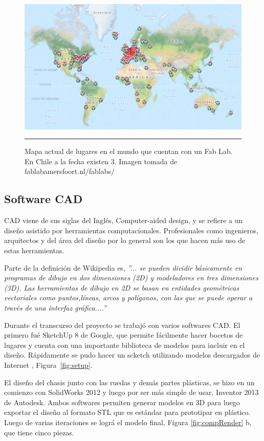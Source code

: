 \begin{figure}[htbp]
	\centering
		\includegraphics[width=\textwidth]{./Figures/map.png}
		\rule{35em}{0.5pt}
	\caption[Mapa fab labs en el mundo.]{Mapa actual de lugares en el mundo que cuentan con un Fab Lab. En Chile a la fecha existen 3. Imagen tomada de fablabamersfoort.nl/fablabs/}
	\label{fig:Fablabs}
\end{figure}	

\subsection{Software CAD}

CAD viene de sus siglas del Inglés, Computer-aided design, y se refiere a un diseño asistido por herramientas computacionales. Profesionales como ingenieros, arquitectos y del área del diseño por lo general son los que hacen más uso de estas herramientas.

Parte de la definición de Wikipedia es, \textit{”... se pueden dividir básicamente en programas de dibujo en dos dimensiones (2D) y modeladores en tres dimensiones (3D). Las herramientas de dibujo en 2D se basan en entidades geométricas vectoriales como puntos,líneas, arcos y polígonos, con las que se puede operar a través de una interfaz gráfica....”}

Durante el transcurso del proyecto se trabajó con varios softwares CAD. El primero fué SketchUp 8 de Google, que permite fácilmente hacer bocetos de lugares y cuenta con una importante biblioteca de modelos para incluir en el diseño. Rápidamente se pudo hacer un scketch utilizando modelos descargados de Internet , Figura~\ref{fig:setup}.

El diseño del chasis junto con las ruedas y demás partes plásticas, se hizo en un comienzo con SolidWorks 2012 y luego por ser más simple de usar, Inventor 2013 de Autodesk. Ambos softwares permiten generar modelos en 3D para luego exportar el diseño al formato STL que es estándar para prototipar en plástico. Luego de varias iteraciones se lográ el modelo final, Figura \ref{fig:compRender} b, que tiene cinco piezas. 


